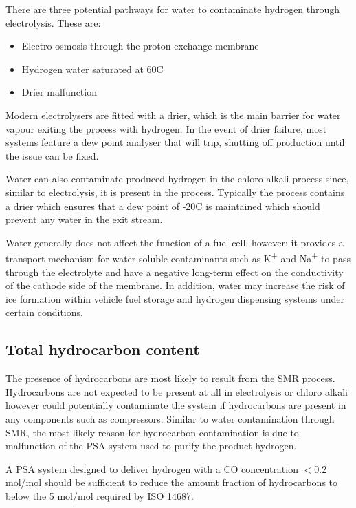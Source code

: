 There are three potential pathways for water to contaminate hydrogen through electrolysis. These are:
\begin{itemize}
    \item Electro-osmosis through the proton exchange membrane
    \item Hydrogen water saturated at 60\textdegree C
    \item Drier malfunction
\end{itemize}
Modern electrolysers are fitted with a drier, which is the main barrier for water vapour exiting the process with hydrogen. \cite{Bacquart2018} In the event of drier failure, most systems feature a dew point analyser that will trip, shutting off production until the issue can be fixed. \cite{Bacquart2018}

Water can also contaminate produced hydrogen in the chloro alkali process since, similar to electrolysis, it is present in the process. Typically the process contains a drier which ensures that a dew point of -20\textdegree C is maintained which should prevent any water in the exit stream.  

Water generally does not affect the function of a fuel cell, however; it provides a transport mechanism for water-soluble contaminants such as K\textsuperscript{+} and Na\textsuperscript{+} \cite{InternationalStandardISO14687-2:20122012} to pass through the electrolyte and have a negative long-term effect on the conductivity of the cathode side of the membrane. In addition, water may increase the risk of ice formation within vehicle fuel storage and hydrogen dispensing systems under certain conditions. 

\subsection*{Total hydrocarbon content}
The presence of hydrocarbons are most likely to result from the SMR process. Hydrocarbons are not expected to be present at all in electrolysis or chloro alkali however could potentially contaminate the system if hydrocarbons are present in any components such as compressors. Similar to water contamination through SMR, the most likely reason for hydrocarbon contamination is due to malfunction of the PSA system used to purify the product hydrogen. 

A PSA system designed to deliver hydrogen with a CO concentration $<$0.2 \textmu mol/mol should be sufficient to reduce the amount fraction of hydrocarbons to below the 5 \textmu mol/mol required by ISO 14687. \cite{Bacquart2018}


